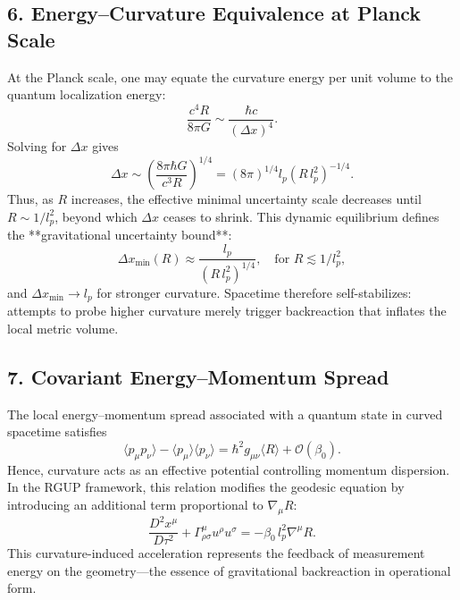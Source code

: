 \documentclass[11pt,oneside]{book}
\numberwithin{equation}{chapter}
\newcommand{\betaz}{\beta_0}
\begin{document}
\subsection*{6. Energy–Curvature Equivalence at Planck Scale}

At the Planck scale, one may equate the curvature energy per unit volume to the quantum localization energy:
\begin{equation}
\frac{c^4 R}{8\pi G} \sim \frac{\hbar c}{(\Delta x)^4}.
\end{equation}
Solving for $\Delta x$ gives
\begin{equation}
\Delta x \sim
\left(\frac{8\pi \hbar G}{c^3 R}\right)^{1/4}
= (8\pi)^{1/4} l_p (R\,l_p^2)^{-1/4}.
\end{equation}
Thus, as $R$ increases, the effective minimal uncertainty scale decreases until $R\sim 1/l_p^2$, beyond which $\Delta x$ ceases to shrink.  
This dynamic equilibrium defines the **gravitational uncertainty bound**:
\begin{equation}
\Delta x_{\min}(R) \approx 
\frac{l_p}{(R\,l_p^2)^{1/4}},
\quad
\text{for } R \lesssim 1/l_p^2,
\end{equation}
and $\Delta x_{\min}\to l_p$ for stronger curvature.  
Spacetime therefore self-stabilizes: attempts to probe higher curvature merely trigger backreaction that inflates the local metric volume.

\subsection*{7. Covariant Energy–Momentum Spread}

The local energy–momentum spread associated with a quantum state in curved spacetime satisfies
\begin{equation}
\langle p_\mu p_\nu \rangle 
- \langle p_\mu\rangle \langle p_\nu\rangle
= \hbar^2 g_{\mu\nu} \langle R\rangle
+ \mathcal{O}(\betaz).
\end{equation}
Hence, curvature acts as an effective potential controlling momentum dispersion.  
In the RGUP framework, this relation modifies the geodesic equation by introducing an additional term proportional to $\nabla_\mu R$:
\begin{equation}
\frac{D^2 x^\mu}{D\tau^2}
+ \Gamma^\mu_{\rho\sigma}u^\rho u^\sigma
= -\betaz\,l_p^2 \nabla^\mu R.
\end{equation}
This curvature-induced acceleration represents the feedback of measurement energy on the geometry—the essence of gravitational backreaction in operational form.
\end{document}
